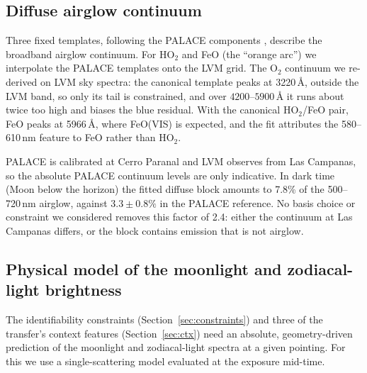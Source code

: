 \subsection{Diffuse airglow continuum}
\label{sec:diffuse}

Three fixed templates, following the PALACE components
\citep{Noll2024,Noll2025}, describe the broadband airglow continuum. For
HO$_2$ and FeO (the ``orange arc'') we interpolate the PALACE templates onto
the LVM grid. The O$_2$ continuum we re-derived on LVM sky spectra: the
canonical template peaks at 3220\,\AA, outside the LVM band, so only its tail
is constrained, and over $4200$--$5900$\,\AA{} it runs about twice too high
and biases the blue residual. With the canonical HO$_2$/FeO pair, FeO peaks
at 5966\,\AA, where FeO(VIS) is expected, and the fit attributes the
580--610\,nm feature to FeO rather than HO$_2$.

PALACE is calibrated at Cerro Paranal and LVM observes from Las Campanas, so
the absolute PALACE continuum levels are only indicative. In dark time (Moon
below the horizon) the fitted diffuse block amounts to 7.8\% of the
500--720\,nm airglow, against $3.3\pm0.8\%$ in the PALACE reference. No
basis choice or constraint we considered removes this factor of 2.4: either
the continuum at Las Campanas differs, or the block contains emission that
is not airglow.

\subsection{Physical model of the moonlight and zodiacal-light brightness}
\label{sec:mzmodel}

The identifiability constraints (Section~\ref{sec:constraints}) and three of
the transfer's context features (Section~\ref{sec:ctx}) need an absolute,
geometry-driven prediction of the moonlight and zodiacal-light spectra at a
given pointing. For this we use a single-scattering model evaluated at the
exposure mid-time.

